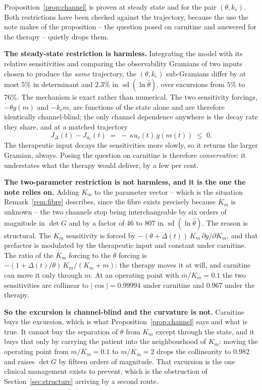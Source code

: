 \begin{remark}
\label{rem:channel_scope}
Proposition~\ref{prop:channel} is proven at steady state and for the pair $(\theta, k_e)$.
Both restrictions have been checked against the trajectory, because the use the note makes
of the proposition -- the question posed on carnitine and answered for the therapy --
quietly drops them.

\textbf{The steady-state restriction is harmless.} Integrating the model with its relative
sensitivities and comparing the observability Gramians of two inputs chosen to produce the
\emph{same} trajectory, the $(\theta, k_e)$ sub-Gramians differ by at most $5\%$ in
determinant and $2.3\%$ in $\operatorname{sd}(\ln\hat\theta)$, over excursions from $5\%$ to
$76\%$. The mechanism is exact rather than numerical. The two sensitivity forcings,
$-\theta g(m)$ and $-k_e m$, are functions of the state alone and are therefore identically
channel-blind; the only channel dependence anywhere is the decay rate they share, and at a
matched trajectory
\begin{equation}
J_{\Delta}(t) - J_{u_c}(t) \;=\; -\,\kappa u_c(t)\, g(m(t)) \;\le\; 0 .
\label{eq:jgap}
\end{equation}
The therapeutic input decays the sensitivities more slowly, so it returns the larger
Gramian, always. Posing the question on carnitine is therefore \emph{conservative}: it
understates what the therapy would deliver, by a few per cent.

\textbf{The two-parameter restriction is not harmless, and it is the one the note relies
on.} Adding $K_m$ to the parameter vector -- which is the situation Remark~\ref{rem:fibre}
describes, since the fibre exists precisely because $K_m$ is unknown -- the two channels
stop being interchangeable by six orders of magnitude in $\det G$ and by a factor of $46$ to
$807$ in $\operatorname{sd}(\ln\hat\theta)$. The reason is structural. The $K_m$ sensitivity
is forced by $-(\theta + \Delta(t))\,K_m\,\partial g/\partial K_m$, and that prefactor is
modulated by the therapeutic input and constant under carnitine. The ratio of the $K_m$
forcing to the $\theta$ forcing is $-(1 + \Delta(t)/\theta)\,K_m/(K_m + m)$: the therapy
moves it at will, and carnitine can move it only through $m$. At an operating point with
$\bar m/K_m = 0.1$ the two sensitivities are collinear to $|\!\cos| = 0.99994$ under
carnitine and $0.967$ under the therapy.

\textbf{So the excursion is channel-blind and the curvature is not.} Carnitine buys the
excursion, which is what Proposition~\ref{prop:channel} says and what is true. It cannot buy
the separation of $\theta$ from $K_m$ except through the state, and it buys that only by
carrying the patient into the neighbourhood of $K_m$: moving the operating point from
$m/K_m = 0.1$ to $m/K_m = 2$ drops the collinearity to $0.982$ and raises $\det G$ by
fifteen orders of magnitude. That excursion is the one clinical management exists to
prevent, which is the obstruction of Section~\ref{sec:structure} arriving by a second route.
\end{remark}

